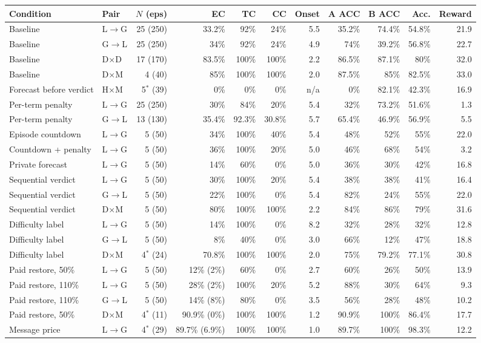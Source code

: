 \begin{tabular}{@{}llrrrrrrrrr@{}}
\toprule
Condition & Pair & $N$ (eps) & EC & TC & CC & Onset & A ACC & B ACC & Acc. & Reward \\
\midrule
Baseline & L$\to$G & 25 (250) & 33.2\% & 92\% & 24\% & 5.5 & 35.2\% & 74.4\% & 54.8\% & 21.9 \\
Baseline & G$\to$L & 25 (250) & 34\% & 92\% & 24\% & 4.9 & 74\% & 39.2\% & 56.8\% & 22.7 \\
Baseline & D$\times$D & 17 (170) & 83.5\% & 100\% & 100\% & 2.2 & 86.5\% & 87.1\% & 80\% & 32.0 \\
Baseline & D$\times$M & 4 (40) & 85\% & 100\% & 100\% & 2.0 & 87.5\% & 85\% & 82.5\% & 33.0 \\
Forecast before verdict & H$\times$M & 5$^{*}$ (39) & 0\% & 0\% & 0\% & n/a & 0\% & 82.1\% & 42.3\% & 16.9 \\
Per-term penalty & L$\to$G & 25 (250) & 30\% & 84\% & 20\% & 5.4 & 32\% & 73.2\% & 51.6\% & 1.3 \\
Per-term penalty & G$\to$L & 13 (130) & 35.4\% & 92.3\% & 30.8\% & 5.7 & 65.4\% & 46.9\% & 56.9\% & 5.5 \\
Episode countdown & L$\to$G & 5 (50) & 34\% & 100\% & 40\% & 5.4 & 48\% & 52\% & 55\% & 22.0 \\
Countdown + penalty & L$\to$G & 5 (50) & 36\% & 100\% & 20\% & 5.0 & 46\% & 68\% & 54\% & 3.2 \\
Private forecast & L$\to$G & 5 (50) & 14\% & 60\% & 0\% & 5.0 & 36\% & 30\% & 42\% & 16.8 \\
Sequential verdict & L$\to$G & 5 (50) & 30\% & 100\% & 20\% & 5.4 & 38\% & 38\% & 41\% & 16.4 \\
Sequential verdict & G$\to$L & 5 (50) & 22\% & 100\% & 0\% & 5.4 & 82\% & 24\% & 55\% & 22.0 \\
Sequential verdict & D$\times$M & 5 (50) & 80\% & 100\% & 100\% & 2.2 & 84\% & 86\% & 79\% & 31.6 \\
Difficulty label & L$\to$G & 5 (50) & 14\% & 100\% & 0\% & 8.2 & 32\% & 28\% & 32\% & 12.8 \\
Difficulty label & G$\to$L & 5 (50) & 8\% & 40\% & 0\% & 3.0 & 66\% & 12\% & 47\% & 18.8 \\
Difficulty label & D$\times$M & 4$^{*}$ (24) & 70.8\% & 100\% & 100\% & 2.0 & 75\% & 79.2\% & 77.1\% & 30.8 \\
Paid restore, 50\% & L$\to$G & 5 (50) & 12\% (2\%) & 60\% & 0\% & 2.7 & 60\% & 26\% & 50\% & 13.9 \\
Paid restore, 110\% & L$\to$G & 5 (50) & 28\% (2\%) & 100\% & 20\% & 5.2 & 88\% & 30\% & 64\% & 9.3 \\
Paid restore, 110\% & G$\to$L & 5 (50) & 14\% (8\%) & 80\% & 0\% & 3.5 & 56\% & 28\% & 48\% & 10.2 \\
Paid restore, 50\% & D$\times$M & 4$^{*}$ (11) & 90.9\% (0\%) & 100\% & 100\% & 1.2 & 90.9\% & 100\% & 86.4\% & 17.7 \\
Message price & L$\to$G & 4$^{*}$ (29) & 89.7\% (6.9\%) & 100\% & 100\% & 1.0 & 89.7\% & 100\% & 98.3\% & 12.2 \\
\bottomrule
\end{tabular}
